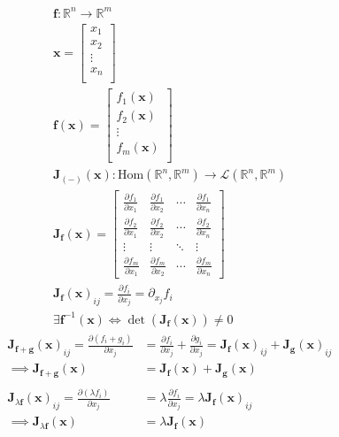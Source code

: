 \documentclass[a4paper,11pt]{article}
\theoremstyle{plain}
\theoremstyle{definition}
\newcommand{\R}{\mathbb{R}}
\newcommand{\J}{\mathbf{J}}
\newcommand{\cL}{\mathcal{L}}
\newcommand{\del}{\partial}
\newcommand{\iff}{\Longleftrightarrow}
\begin{document}
\begin{align*}
	\mathbf{f}:\R^n\to\R^m \\
	\mathbf{x} = 
	\begin{bmatrix}
		x_1 \\
		x_2 \\
		\vdots \\
		x_n \\
	\end{bmatrix} \\
	\mathbf{f}(\mathbf{x}) = 
	\begin{bmatrix}
		f_1(\mathbf{x}) \\
		f_2(\mathbf{x}) \\
		\vdots \\
		f_m(\mathbf{x}) \\
	\end{bmatrix} \\
	\J_{(-)}(\mathbf{x}):\text{Hom}(\R^n,\R^m) \to \cL(\R^n,\R^m)\\
	{\J}_{\mathbf{f}}(\mathbf{x}) = 
		\begin{bmatrix}
			\frac{\del f_1}{\del x_1} & \frac{\del f_1}{\del x_2} & \cdots & \frac{\del f_1}{\del x_n} \\
			\frac{\del f_2}{\del x_1} & \frac{\del f_2}{\del x_2} & \cdots & \frac{\del f_2}{\del x_n} \\
			\vdots                    & \vdots                    & \ddots & \vdots                    \\
			\frac{\del f_m}{\del x_1} & \frac{\del f_m}{\del x_2} & \cdots & \frac{\del f_m}{\del x_n}
		\end{bmatrix} \\
		{{\J}_{\mathbf{f}}(\mathbf{x})}_{ij} = \frac{\del f_i}{\del x_j} =
		\del_{x_j} f_i \\
		\exists \mathbf{f}^{-1}(\mathbf{x}) \iff \det(\J_\mathbf{f}(\mathbf{x}))
			\neq 0
\end{align*}
\begin{align*}
	{\J_{\mathbf{f}+\mathbf{g}}(\mathbf{x})}_{ij} = \frac{\del (f_i+g_i)}{\del
	x_j} &= \frac{\del f_i}{\del{ x_j}}+\frac{\del g_i}{\del{ x_j}} =
	{\J_{\mathbf{f}}(\mathbf{x})}_{ij}+	{\J_{\mathbf{g}}(\mathbf{x})}_{ij} \\
	\implies
	{\J_{\mathbf{f}+\mathbf{g}}(\mathbf{x})} &=
	{\J_{\mathbf{f}}(\mathbf{x})}+{\J_{\mathbf{g}}(\mathbf{x})} \\
	\\
	{\J_{\lambda\mathbf{f}}(\mathbf{x})}_{ij} = \frac{\del (\lambda f_i)}{\del
	x_j} &= \lambda \frac{\del f_i}{\del x_j} =
	\lambda {\J_{\mathbf{f}}(\mathbf{x})}_{ij} \\
	\implies {\J_{\lambda\mathbf{f}}(\mathbf{x})} &=
	\lambda {\J_{\mathbf{f}}(\mathbf{x})} \\
	\\
\end{align*}
\end{document}
